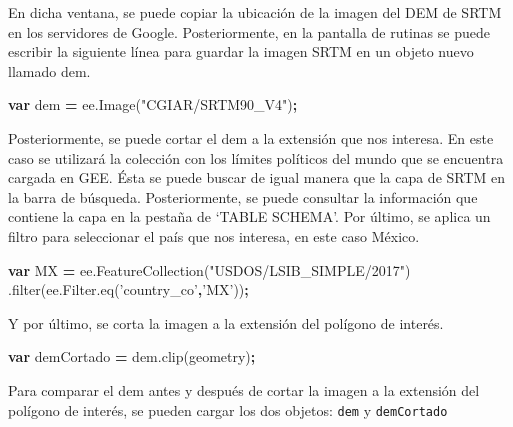 \documentclass[
]{article}
\newenvironment{Shaded}{\begin{snugshade}}{\end{snugshade}}
\newcommand{\AttributeTok}[1]{\textcolor[rgb]{0.77,0.63,0.00}{#1}}
\newcommand{\KeywordTok}[1]{\textcolor[rgb]{0.13,0.29,0.53}{\textbf{#1}}}
\newcommand{\NormalTok}[1]{#1}
\newcommand{\OperatorTok}[1]{\textcolor[rgb]{0.81,0.36,0.00}{\textbf{#1}}}
\newcommand{\StringTok}[1]{\textcolor[rgb]{0.31,0.60,0.02}{#1}}
\newcommand{\VariableTok}[1]{\textcolor[rgb]{0.00,0.00,0.00}{#1}}
\begin{document}
En dicha ventana, se puede copiar la ubicación de la imagen del DEM de
SRTM en los servidores de Google. Posteriormente, en la pantalla de
rutinas se puede escribir la siguiente línea para guardar la imagen SRTM
en un objeto nuevo llamado dem.

\begin{Shaded}
\begin{Highlighting}[]
\KeywordTok{var}\NormalTok{ dem }\OperatorTok{=} \VariableTok{ee}\NormalTok{.}\AttributeTok{Image}\NormalTok{(}\StringTok{"CGIAR/SRTM90_V4"}\NormalTok{)}\OperatorTok{;}
\end{Highlighting}
\end{Shaded}

Posteriormente, se puede cortar el dem a la extensión que nos interesa.
En este caso se utilizará la colección con los límites políticos del
mundo que se encuentra cargada en GEE. Ésta se puede buscar de igual
manera que la capa de SRTM en la barra de búsqueda. Posteriormente, se
puede consultar la información que contiene la capa en la pestaña de
`TABLE SCHEMA'. Por último, se aplica un filtro para seleccionar el país
que nos interesa, en este caso México.

\begin{Shaded}
\begin{Highlighting}[]
\KeywordTok{var}\NormalTok{ MX }\OperatorTok{=} \VariableTok{ee}\NormalTok{.}\AttributeTok{FeatureCollection}\NormalTok{(}\StringTok{"USDOS/LSIB_SIMPLE/2017"}\NormalTok{)}
\NormalTok{  .}\AttributeTok{filter}\NormalTok{(}\VariableTok{ee}\NormalTok{.}\VariableTok{Filter}\NormalTok{.}\AttributeTok{eq}\NormalTok{(}\StringTok{'country_co'}\OperatorTok{,}\StringTok{'MX'}\NormalTok{))}\OperatorTok{;}
\end{Highlighting}
\end{Shaded}

Y por último, se corta la imagen a la extensión del polígono de interés.

\begin{Shaded}
\begin{Highlighting}[]
\KeywordTok{var}\NormalTok{ demCortado }\OperatorTok{=} \VariableTok{dem}\NormalTok{.}\AttributeTok{clip}\NormalTok{(geometry)}\OperatorTok{;}
\end{Highlighting}
\end{Shaded}

Para comparar el dem antes y después de cortar la imagen a la extensión
del polígono de interés, se pueden cargar los dos objetos: \texttt{dem}
y \texttt{demCortado}
\end{document}
